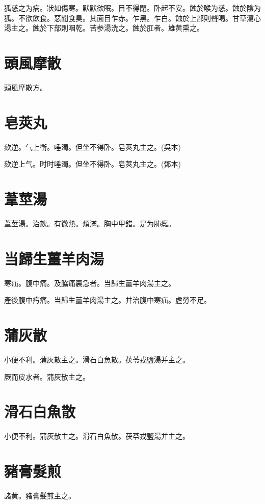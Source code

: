 \documentclass[12pt,twoside,UTF8,b5paper]{ctexbook}
\begin{document}
狐惑之为病。狀如傷寒。默默欲眠。目不得閉。卧起不安。蝕於喉为惑。蝕於陰为狐。不欲飲食。惡聞食臭。其面目乍赤。乍黑。乍白。蝕於上部則聲喝。甘草瀉心湯主之。蝕於下部則咽乾。苦参湯洗之。蝕於肛者。雄黄熏之。

\section{頭風摩散}

頭風摩散方。

\section{皂莢丸}

欬逆。气上衝。唾濁。但坐不得卧。皂莢丸主之。(吳本)

欬逆上气。时时唾濁。但坐不得卧。皂莢丸主之。(鄧本)

\section{葦莖湯}

葦莖湯。治欬。有微熱。煩滿。胸中甲錯。是为肺癰。

\section{当歸生薑羊肉湯}

寒疝。腹中痛。及脇痛裏急者。当歸生薑羊肉湯主之。

產後腹中㽲痛。当歸生薑羊肉湯主之。并治腹中寒疝。虗勞不足。

\section{蒲灰散}

小便不利。蒲灰散主之。滑石白魚散。茯苓戎鹽湯并主之。

厥而皮水者。蒲灰散主之。

\section{滑石白魚散}

小便不利。蒲灰散主之。滑石白魚散。茯苓戎鹽湯并主之。

\section{豬膏髮煎}

諸黄。豬膏髮煎主之。
\end{document}
